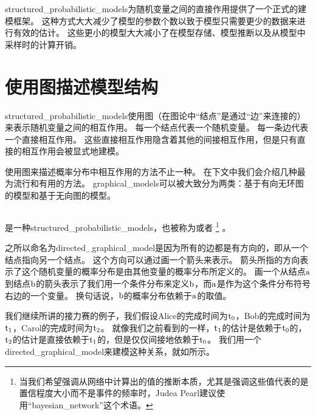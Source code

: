\gls{structured_probabilistic_models}为随机变量之间的直接作用提供了一个正式的建模框架。
这种方式大大减少了模型的参数个数以致于模型只需要更少的数据来进行有效的估计。
这些更小的模型大大减小了在模型存储、模型推断以及从模型中采样时的计算开销。


\section{使用图描述模型结构}
\label{sec:using_graphs_to_describe_model_structure}


\gls{structured_probabilistic_models}使用图（在图论中``结点''是通过``边''来连接的）来表示随机变量之间的相互作用。
每一个结点代表一个随机变量。
每一条边代表一个直接相互作用。
这些直接相互作用隐含着其他的间接相互作用，但是只有直接的相互作用会被显式地建模。


使用图来描述概率分布中相互作用的方法不止一种。
在下文中我们会介绍几种最为流行和有用的方法。
\gls{graphical_models}可以被大致分为两类：基于有向无环图的模型和基于无向图的模型。


\subsection{}
\label{sec:directed_models}


是一种\gls{structured_probabilistic_models}，也被称为或者
\footnote{当我们希望强调从网络中计算出的值的推断本质，尤其是强调这些值代表的是置信程度大小而不是事件的频率时，Judea Pearl建议使用``\gls{bayesian_network}''这个术语。}%
 \citep{pearl85bayesian}。


之所以命名为\gls{directed_graphical_model}是因为所有的边都是有方向的，即从一个结点指向另一个结点。
这个方向可以通过画一个箭头来表示。
箭头所指的方向表示了这个随机变量的概率分布是由其他变量的概率分布所定义的。
画一个从结点$\mathrm{a}$到结点$\mathrm{b}$的箭头表示了我们用一个条件分布来定义$\mathrm{b}$，而$\mathrm{a}$是作为这个条件分布符号右边的一个变量。
换句话说，$\mathrm{b}$的概率分布依赖于$\mathrm{a}$的取值。


我们继续所讲的接力赛的例子，我们假设Alice的完成时间为$\mathrm{t}_0$，Bob的完成时间为$\mathrm{t}_1$，Carol的完成时间为$\mathrm{t}_2$。
就像我们之前看到的一样，$\mathrm{t}_1$的估计是依赖于$\mathrm{t}_0$的，$\mathrm{t}_2$的估计是直接依赖于$\mathrm{t}_1$的，但是仅仅间接地依赖于$\mathrm{t}_0$。
我们用一个\gls{directed_graphical_model}来建模这种关系，就如所示。



